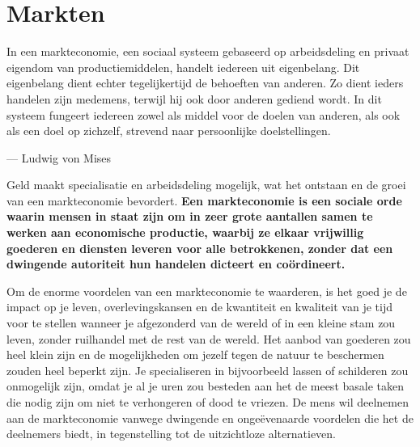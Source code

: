 \hypertarget{markten}{%
\chapter{Markten}\label{markten}}

\vspace{-2em}
\begin{blockquotebox}
    In een markteconomie, een sociaal systeem gebaseerd op arbeidsdeling en privaat eigendom van productiemiddelen, handelt iedereen uit eigenbelang. Dit eigenbelang dient echter tegelijkertijd de behoeften van anderen. Zo dient ieders handelen zijn medemens, terwijl hij ook door anderen gediend wordt. In dit systeem fungeert iedereen zowel als middel voor de doelen van anderen, als ook als een doel op zichzelf, strevend naar persoonlijke doelstellingen.
\footnotemark
    \par\raggedleft--- Ludwig von Mises
\end{blockquotebox}

Geld maakt specialisatie en arbeidsdeling mogelijk, wat het ontstaan en de groei van een markteconomie bevordert. \textbf{Een markteconomie is een sociale orde waarin mensen in staat zijn om in zeer grote aantallen samen te werken aan economische productie, waarbij ze elkaar vrijwillig goederen en diensten leveren voor alle betrokkenen, zonder dat een dwingende autoriteit hun handelen dicteert en coördineert.}

Om de enorme voordelen van een markteconomie te waarderen, is het goed je de impact op je leven, overlevingskansen en de kwantiteit en kwaliteit van je tijd voor te stellen wanneer je afgezonderd van de wereld of in een kleine stam zou leven, zonder ruilhandel met de rest van de wereld. Het aanbod van goederen zou heel klein zijn en de mogelijkheden om jezelf tegen de natuur te beschermen zouden heel beperkt zijn. Je specialiseren in bijvoorbeeld lassen of schilderen zou onmogelijk zijn, omdat je al je uren zou besteden aan het de meest basale taken die nodig zijn om niet te verhongeren of dood te vriezen. De mens wil deelnemen aan de markteconomie vanwege dwingende en ongeëvenaarde voordelen die het de deelnemers biedt, in tegenstelling tot de uitzichtloze alternatieven.

